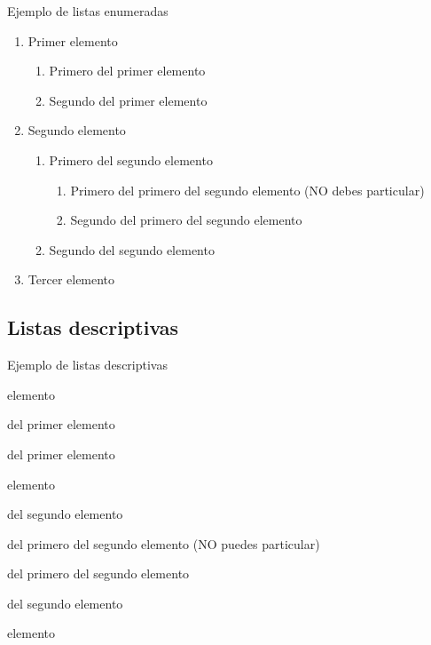 \documentclass[10pt, envcountsect, presentation, aspectratio=43]{beamer}
\begin{document}
\begin{frame}{Ejemplo de listas enumeradas}
\begin{enumerate}
\item Primer elemento
	\begin{enumerate}
	\item Primero del primer elemento
	\item Segundo del primer elemento 
	\end{enumerate}
\item Segundo elemento
	\begin{enumerate}
	\item Primero del segundo elemento
			\begin{enumerate}
			\item[--] Primero del primero del segundo elemento (NO debes particular)
			\item Segundo del primero del segundo elemento 
			\end{enumerate}

	\item Segundo del segundo elemento 
	\end{enumerate}
\item Tercer elemento
\end{enumerate}
\end{frame}


\subsection{Listas descriptivas}


\begin{frame}{Ejemplo de listas descriptivas}


\begin{description}[12]
\item[Primer] elemento
	\begin{description}[12]
	\item[Primero] del primer elemento
	\item[Segundo] del primer elemento 
	\end{description}
\item[Segundo] elemento
	\begin{description}[12]
	\item[Primero] del segundo elemento
			\begin{description}[6]
			\item[Primero] del primero del segundo elemento (NO puedes particular)
			\item[Segundo] del primero del segundo elemento 
			\end{description}

	\item[Segundo] del segundo elemento 
	\end{description}
\item[Tercer] elemento
\end{description}
\end{frame}
\end{document}
